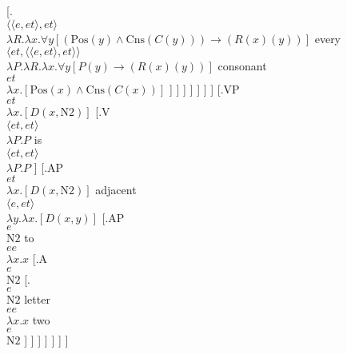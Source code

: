 \documentclass{article}
\begin{document}
[.{\\
$\langle \langle e,et\rangle ,et\rangle $
\\
$\lambda R.\lambda x.\forall y[(\mbox{Pos}(y) \land \mbox{Cns}(C(y))) \rightarrow (R(x) (y))]$
}  
{every\\$\langle et,\langle \langle e,et\rangle ,et\rangle \rangle $\\
$\lambda P.\lambda R.\lambda x.\forall y[P(y) \rightarrow (R(x) (y))]$
 } 
{consonant\\$et$\\
$\lambda x.[\mbox{Pos}(x) \land \mbox{Cns}(C(x))]$
 } ]  ]  ]  ]  ]  ]  ]  
[.{VP\\
$et$
\\
$\lambda x.[D(x,\mbox{N2})]$
}  
[.{V\\
$\langle et,et\rangle $
\\
$\lambda P.P$
}  
{is\\$\langle et,et\rangle $\\
$\lambda P.P$
 } ]  
[.{AP\\
$et$
\\
$\lambda x.[D(x,\mbox{N2})]$
}  
{adjacent\\$\langle e,et\rangle $\\
$\lambda y.\lambda x.[D(x,y)]$
 } 
[.{AP\\
$e$
\\
$\mbox{N2}$
}  
{to\\$ee$\\
$\lambda x.x$
 } 
[.{A\\
$e$
\\
$\mbox{N2}$
}  
[.{\\
$e$
\\
$\mbox{N2}$
}  
{letter\\$ee$\\
$\lambda x.x$
 } 
{two\\$e$\\
$\mbox{N2}$
 } ]  ]  ]  ]  ]  ]  ] 
\end{document}
